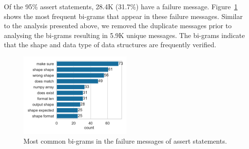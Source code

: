 Of the 95\% assert statements, 28.4K (31.7\%) have a failure message. Figure~\ref{fig:common-assert-msgs} shows the most frequent bi-grams that appear in these failure messages. Similar to the analysis presented above, we removed the duplicate messages prior to analysing the bi-grams resulting in 5.9K unique messages. The bi-grams indicate that the shape and data type of data structures are frequently verified.

\begin{figure}
  \centering
  \includegraphics[width=0.5\textwidth]{common-assert-msgs.pdf}
  \caption{Most common bi-grams in the failure messages of assert statements.}
  \label{fig:common-assert-msgs}
\end{figure}

